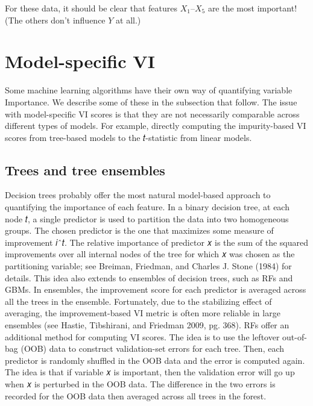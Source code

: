 For these data, it should be clear that features $X_1$--$X_5$ are the most important! (The others don't influence $Y$ at all.)


\section{Model-specific VI}

Some machine learning algorithms have their own way of quantifying variable Importance. We describe some of these in the subsection that follow. The issue with model-specific VI scores is that they are not necessarily comparable across different types of models. For example, directly computing the impurity-based VI scores from tree-based models to the 𝑡-statistic from linear models.

\subsection{Trees and tree ensembles}

Decision trees probably offer the most natural model-based approach to quantifying the importance of each feature. In a binary decision tree, at each node 𝑡, a single predictor is used to partition the data into two homogeneous groups. The chosen predictor is the one that maximizes some measure of improvement 𝑖ˆ𝑡. The relative importance of predictor 𝑥 is the sum of the squared improvements over all internal nodes of the tree for which 𝑥 was chosen as the partitioning variable; see Breiman, Friedman, and Charles J. Stone (1984) for details. This idea also extends to ensembles of decision trees, such as RFs and GBMs. In ensembles, the improvement score for each predictor is averaged across all the trees in the ensemble. Fortunately, due to the stabilizing effect of averaging, the improvement-based VI metric is often more reliable in large ensembles (see Hastie, Tibshirani, and Friedman 2009, pg. 368). RFs offer an additional method for computing VI scores. The idea is to use the leftover out-of-bag (OOB) data to construct validation-set errors for each tree. Then, each predictor is randomly shuffled in the OOB data and the error is computed again. The idea is that if variable 𝑥 is important, then the validation error will go up when 𝑥 is perturbed in the OOB data. The difference in the two errors is recorded for the OOB data then averaged across all trees in the forest.


